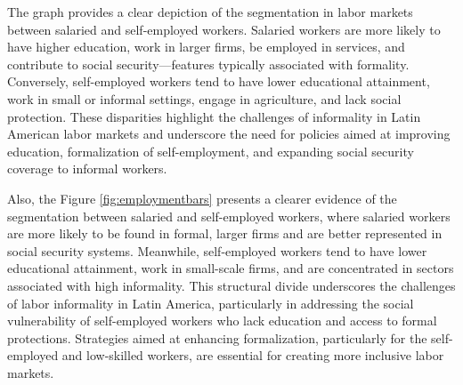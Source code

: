 \documentclass[english]{article}
\begin{document}
\begin{enumerate}
The graph provides a clear depiction of the segmentation in labor markets between salaried and self-employed workers. Salaried workers are more likely to have higher education, work in larger firms, be employed in services, and contribute to social security—features typically associated with formality. Conversely, self-employed workers tend to have lower educational attainment, work in small or informal settings, engage in agriculture, and lack social protection. These disparities highlight the challenges of informality in Latin American labor markets and underscore the need for policies aimed at improving education, formalization of self-employment, and expanding social security coverage to informal workers.


Also, the Figure \ref{fig:employmentbars} presents a clearer evidence of the segmentation between salaried and self-employed workers, where salaried workers are more likely to be found in formal, larger firms and are better represented in social security systems. Meanwhile, self-employed workers tend to have lower educational attainment, work in small-scale firms, and are concentrated in sectors associated with high informality. This structural divide underscores the challenges of labor informality in Latin America, particularly in addressing the social vulnerability of self-employed workers who lack education and access to formal protections. Strategies aimed at enhancing formalization, particularly for the self-employed and low-skilled workers, are essential for creating more inclusive labor markets.


\end{enumerate}
\end{document}
